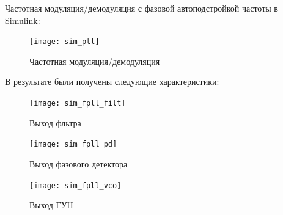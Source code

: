 \documentclass[10pt,a4paper]{article}
\begin{document}
Частотная модуляция/демодуляция с фазовой автоподстройкой частоты в Simulink:
\begin{figure}[h]\centering
    \texttt{[image: sim\_pll]} 
    \caption{Частотная модуляция/демодуляция}\label{fig.sim_pll}
\end{figure}                                                                                                                                                                                                                                                                                                                                                                                                                                                                                                                                                                                                                                                                                                                                                                                                                                                                                                                                                                                                                                                                                                                                                                                                                                                                                                                                                                                                                                                                       

В результате были получены следующие характеристики:

\begin{figure}[h]\centering
    \texttt{[image: sim\_fpll\_filt]} 
    \caption{Выход фльтра}\label{fig.sim_fpll_filt}
\end{figure}
\begin{figure}[h]\centering
  \parbox[b]{0.49\textwidth}{\centering
    \texttt{[image: sim\_fpll\_pd]} 
    \caption{Выход фазового детектора}\label{fig.sim_fm}}
  \hfil\hfil 
  \begin{minipage}[b]{0.49\textwidth}
	\centering
	\texttt{[image: sim\_fpll\_vco]}
	\caption{Выход ГУН}\label{fig.sim_fpll_vco} 
  \end{minipage}
\end{figure}

\FloatBarrier
\end{document}
